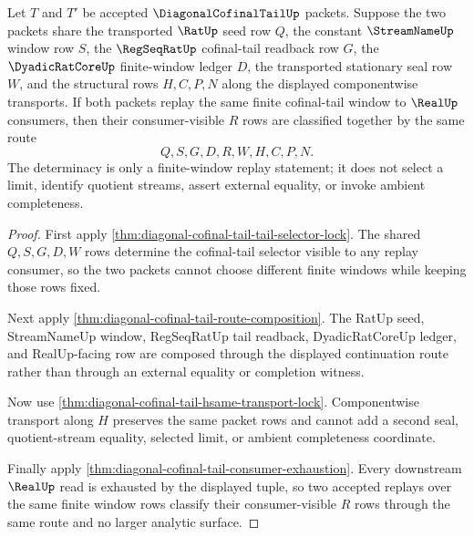 \begin{theorem}
\label{thm:diagonal-cofinal-tail-finite-window-replay-determinacy}
Let $T$ and $T'$ be accepted $\DiagonalCofinalTailUp$ packets. Suppose the two packets share the transported $\RatUp$ seed row $Q$, the constant $\StreamNameUp$ window row $S$, the $\RegSeqRatUp$ cofinal-tail readback row $G$, the $\DyadicRatCoreUp$ finite-window ledger $D$, the transported stationary seal row $W$, and the structural rows $H,C,P,N$ along the displayed componentwise transports. If both packets replay the same finite cofinal-tail window to $\RealUp$ consumers, then their consumer-visible $R$ rows are classified together by the same route
$$
Q,S,G,D,R,W,H,C,P,N.
$$
The determinacy is only a finite-window replay statement; it does not select a limit, identify quotient streams, assert external equality, or invoke ambient completeness.
\end{theorem}
\begin{proof}
First apply \autoref{thm:diagonal-cofinal-tail-tail-selector-lock}. The shared $Q,S,G,D,W$ rows determine the cofinal-tail selector visible to any replay consumer, so the two packets cannot choose different finite windows while keeping those rows fixed.

Next apply \autoref{thm:diagonal-cofinal-tail-route-composition}. The RatUp seed, StreamNameUp window, RegSeqRatUp tail readback, DyadicRatCoreUp ledger, and RealUp-facing row are composed through the displayed continuation route rather than through an external equality or completion witness.

Now use \autoref{thm:diagonal-cofinal-tail-hsame-transport-lock}. Componentwise transport along $H$ preserves the same packet rows and cannot add a second seal, quotient-stream equality, selected limit, or ambient completeness coordinate.

Finally apply \autoref{thm:diagonal-cofinal-tail-consumer-exhaustion}. Every downstream $\RealUp$ read is exhausted by the displayed tuple, so two accepted replays over the same finite window rows classify their consumer-visible $R$ rows through the same route and no larger analytic surface.
\end{proof}

